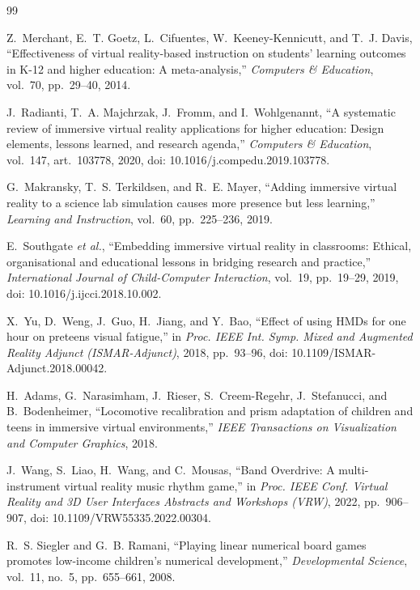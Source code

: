 \documentclass[conference]{IEEEtran}
\begin{document}
\begin{thebibliography}{99}

Z.~Merchant, E.~T. Goetz, L.~Cifuentes, W.~Keeney-Kennicutt, and T.~J. Davis, ``Effectiveness of virtual reality-based instruction on students' learning outcomes in K-12 and higher education: A meta-analysis,'' \emph{Computers \& Education}, vol.~70, pp.~29--40, 2014.

J.~Radianti, T.~A. Majchrzak, J.~Fromm, and I.~Wohlgenannt, ``A systematic review of immersive virtual reality applications for higher education: Design elements, lessons learned, and research agenda,'' \emph{Computers \& Education}, vol.~147, art.~103778, 2020, doi: 10.1016/j.compedu.2019.103778.

G.~Makransky, T.~S. Terkildsen, and R.~E. Mayer, ``Adding immersive virtual reality to a science lab simulation causes more presence but less learning,'' \emph{Learning and Instruction}, vol.~60, pp.~225--236, 2019.

E.~Southgate \emph{et al.}, ``Embedding immersive virtual reality in classrooms: Ethical, organisational and educational lessons in bridging research and practice,'' \emph{International Journal of Child-Computer Interaction}, vol.~19, pp.~19--29, 2019, doi: 10.1016/j.ijcci.2018.10.002.

X.~Yu, D.~Weng, J.~Guo, H.~Jiang, and Y.~Bao, ``Effect of using HMDs for one hour on preteens visual fatigue,'' in \emph{Proc. IEEE Int. Symp. Mixed and Augmented Reality Adjunct (ISMAR-Adjunct)}, 2018, pp.~93--96, doi: 10.1109/ISMAR-Adjunct.2018.00042.

H.~Adams, G.~Narasimham, J.~Rieser, S.~Creem-Regehr, J.~Stefanucci, and B.~Bodenheimer, ``Locomotive recalibration and prism adaptation of children and teens in immersive virtual environments,'' \emph{IEEE Transactions on Visualization and Computer Graphics}, 2018.

J.~Wang, S.~Liao, H.~Wang, and C.~Mousas, ``Band Overdrive: A multi-instrument virtual reality music rhythm game,'' in \emph{Proc. IEEE Conf. Virtual Reality and 3D User Interfaces Abstracts and Workshops (VRW)}, 2022, pp.~906--907, doi: 10.1109/VRW55335.2022.00304.

R.~S. Siegler and G.~B. Ramani, ``Playing linear numerical board games promotes low-income children's numerical development,'' \emph{Developmental Science}, vol.~11, no.~5, pp.~655--661, 2008.


\end{thebibliography}
\end{document}
